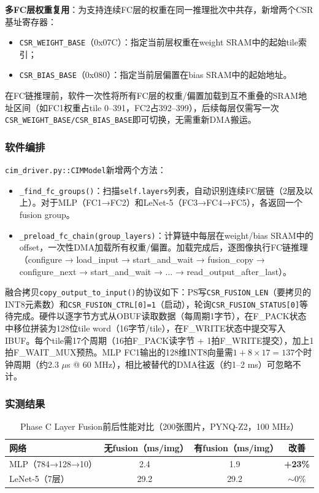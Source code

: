 \documentclass[12pt, a4paper]{article}
\begin{document}
\textbf{多FC层权重复用}：为支持连续FC层的权重在同一推理批次中共存，新增两个CSR基址寄存器：
\begin{itemize}
    \item \texttt{CSR\_WEIGHT\_BASE}（0x07C）：指定当前层权重在weight SRAM中的起始tile索引；
    \item \texttt{CSR\_BIAS\_BASE}（0x080）：指定当前层偏置在bias SRAM中的起始地址。
\end{itemize}

在FC链推理前，软件一次性将所有FC层的权重/偏置加载到互不重叠的SRAM地址区间（如FC1权重占tile 0--391，FC2占392--399），后续每层仅需写一次\texttt{CSR\_WEIGHT\_BASE/CSR\_BIAS\_BASE}即可切换，无需重新DMA搬运。

\subsubsection{软件编排}

\texttt{cim\_driver.py::CIMModel}新增两个方法：

\begin{itemize}
    \item \texttt{\_find\_fc\_groups()}：扫描\texttt{self.layers}列表，自动识别连续FC层链（2层及以上）。对于MLP（FC1→FC2）和LeNet-5（FC3→FC4→FC5），各返回一个fusion group。
    \item \texttt{\_preload\_fc\_chain(group\_layers)}：计算链中每层在weight/bias SRAM中的offset，一次性DMA加载所有权重/偏置。加载完成后，逐图像执行FC链推理（configure → load\_input → start\_and\_wait → fusion\_copy → configure\_next → start\_and\_wait → ... → read\_output\_after\_last）。
\end{itemize}

融合拷贝\texttt{copy\_output\_to\_input()}的协议如下：PS写\texttt{CSR\_FUSION\_LEN}（要拷贝的INT8元素数）和\texttt{CSR\_FUSION\_CTRL[0]=1}（启动），轮询\texttt{CSR\_FUSION\_STATUS[0]}等待完成。硬件以逐字节方式从OBUF读取数据（每周期1字节），在F\_PACK状态中移位拼装为128位tile word（16字节/tile），在F\_WRITE状态中提交写入IBUF。每个tile需17个周期（16拍F\_PACK读字节 + 1拍F\_WRITE提交），加上1拍F\_WAIT\_MUX预热。MLP FC1输出的128维INT8向量需$1 + 8\times17 = 137$个时钟周期（约2.3 $\mu$s @ 60 MHz），相比被替代的DMA往返（约1--2 ms）可忽略不计。

\subsubsection{实测结果}

\begin{table}[H]
    \centering
    \caption{Phase C Layer Fusion前后性能对比（200张图片，PYNQ-Z2，100 MHz）}
    \label{tab:phase_c_benchmark}
    \begin{tabular}{lccc}
        \toprule
        网络 & 无fusion（ms/img） & 有fusion（ms/img） & 改善 \\
        \midrule
        MLP（784→128→10） & 2.4 & 1.9 & \textbf{+23\%} \\
        LeNet-5（7层） & 29.2 & 29.2 & $\sim$0\% \\
        \bottomrule
    \end{tabular}
\end{table}
\end{document}
